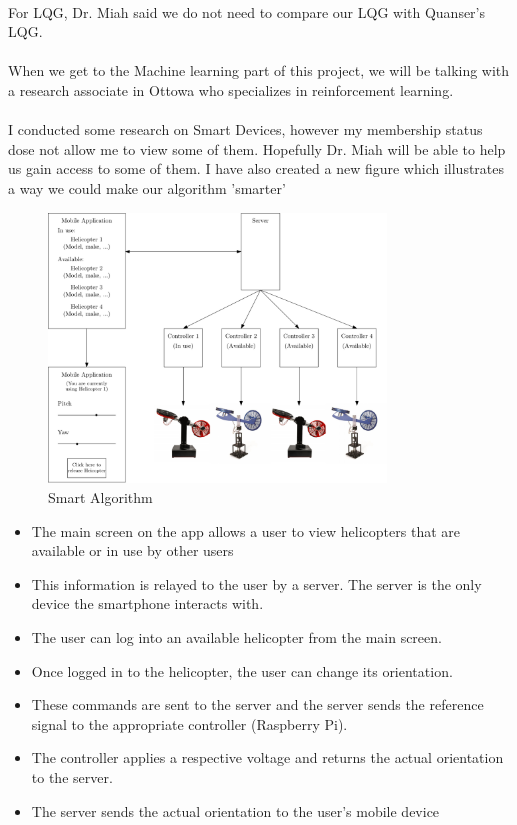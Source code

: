 \documentclass[fontsize=11pt, %
                             paper=letter, %
                             openany, %
                             captions=tableheading,
                             index=totoc,
                             hyperref]{labbook}
\begin{document}
\begin{addmargin}[0cm]{0cm}
\\
For LQG, Dr. Miah said we do not need to compare our LQG with Quanser's LQG.\\
\\
When we get to the Machine learning part of this project, we will be talking with a research associate in Ottowa who specializes in reinforcement learning.\\
\\
I conducted some research on Smart Devices, however my membership status dose not allow me to view some of them.  Hopefully Dr. Miah will be able to help us gain access to some of them.  I have also created a new figure which illustrates a way we could make our algorithm 'smarter'
\begin{figure}
  \centering
  \includegraphics[width=0.8\textwidth]{figs/ipe/smartAlg}
  \caption{Smart Algorithm}
  \label{fig:Smart_Alg}
\end{figure}

\begin{itemize}
    \item The main screen on the app allows a user to view helicopters that are available or in use by other users
    \item This information is relayed to the user by a server.  The server is the only device the smartphone interacts with.
    \item The user can log into an available helicopter from the main screen.
    \item Once logged in to the helicopter, the user can change its orientation.
    \item These commands are sent to the server and the server sends the reference signal to the appropriate controller (Raspberry Pi).
    \item The controller applies a respective voltage and returns the actual orientation to the server.
    \item The server sends the actual orientation to the user's mobile device
\end{itemize}



\end{addmargin}
\end{document}
